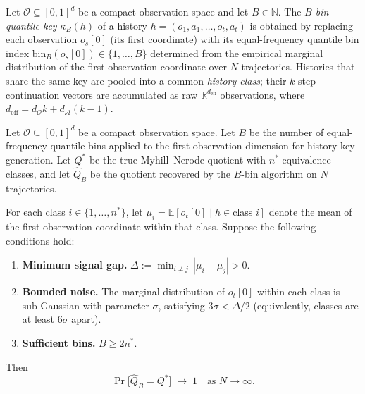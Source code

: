 
\begin{definition}
Let $\mathcal{O} \subseteq [0,1]^d$ be a compact observation space and let $B \in \mathbb{N}$.
The \emph{$B$-bin quantile key} $\kappa_B(h)$ of a history
$h = (o_1, a_1, \ldots, o_t, a_t)$ is obtained by replacing each observation
$o_s[0]$ (its first coordinate) with its equal-frequency quantile bin index
$\mathrm{bin}_B(o_s[0]) \in \{1, \ldots, B\}$ determined from the empirical marginal
distribution of the first observation coordinate over $N$ trajectories.
Histories that share the same key are pooled into a common \emph{history class};
their $k$-step continuation vectors are accumulated as raw $\mathbb{R}^{d_{\mathrm{eff}}}$
observations, where $d_{\mathrm{eff}} = d_{\mathcal{O}} k + d_{\mathcal{A}}(k-1)$.
\end{definition}

\begin{proposition}
\label{prop:binning-approx}
Let $\mathcal{O} \subseteq [0,1]^d$ be a compact observation space.
Let $B$ be the number of equal-frequency quantile bins applied to the first
observation dimension for history key generation.
Let $Q^*$ be the true Myhill--Nerode quotient with $n^*$ equivalence classes, and let
$\widehat{Q}_B$ be the quotient recovered by the $B$-bin algorithm on $N$ trajectories.

For each class $i \in \{1,\ldots,n^*\}$, let
$\mu_i = \mathbb{E}[o_t[0] \mid h \in \text{class } i]$
denote the mean of the first observation coordinate within that class.
Suppose the following conditions hold:
\begin{enumerate}[\upshape(a)]
    \item \textbf{Minimum signal gap.}
        $\Delta := \min_{i \neq j}\,|\mu_i - \mu_j| > 0$.
    \item \textbf{Bounded noise.}
        The marginal distribution of $o_t[0]$ within each class is sub-Gaussian with
        parameter $\sigma$, satisfying $3\sigma < \Delta/2$
        (equivalently, classes are at least $6\sigma$ apart).
    \item \textbf{Sufficient bins.}
        $B \geq 2n^*$.
\end{enumerate}
Then
\[
    \Pr\!\bigl[\widehat{Q}_B = Q^*\bigr] \;\longrightarrow\; 1
    \quad\text{as } N \to \infty.
\]
\end{proposition}

